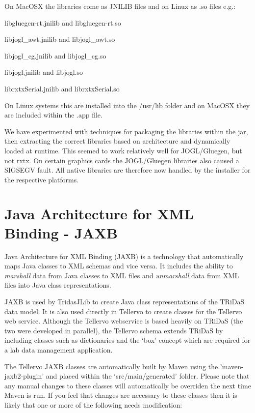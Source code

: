 On MacOSX the libraries come as JNILIB files and on Linux as .so files e.g.:

\begin{itemize*}
 \item libgluegen-rt.jnilib and libgluegen-rt.so
 \item libjogl\_awt.jnilib and libjogl\_awt.so
 \item libjogl\_cg.jnilib and libjogl\_cg.so
 \item libjogl.jnilib and libjogl.so
 \item librxtxSerial.jnilib and librxtxSerial.so
\end{itemize*}

On Linux systems this are installed into the /usr/lib folder and on MacOSX they are included within the .app file.

We have experimented with techniques for packaging the libraries within the jar, then extracting the correct libraries based on architecture and dynamically loaded at runtime.  This seemed to work relatively well for JOGL/Gluegen, but not rxtx.  On certain graphics cards the JOGL/Gluegen libraries also caused a SIGSEGV fault.  All native libraries are therefore now handled by the installer for the respective platforms.  


\section{Java Architecture for XML Binding - JAXB}
\label{txt:jaxb}

Java Architecture for XML Binding (JAXB) is a technology that automatically maps Java classes to XML schemas and vice versa.  It includes the ability to \emph{marshall} data from Java classes to XML files and \emph{unmarshall} data from XML files into Java class representations.  

JAXB is used by TridasJLib to create Java class representations of the TRiDaS data model.  It is also used directly in Tellervo to create classes for the Tellervo web service.  Although the Tellervo webservice is based heavily on TRiDaS (the two were developed in parallel), the Tellervo schema extends TRiDaS by including classes such as dictionaries and the `box' concept which are required for a lab data management application.  

The Tellervo JAXB classes are automatically built by Maven using the 'maven-jaxb2-plugin' and placed within the `src/main/generated' folder.  Please note that any manual changes to these classes will automatically be overriden the next time Maven is run.  If you feel that changes are necessary to these classes then it is likely that one or more of the following needs modification:

